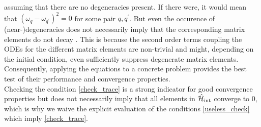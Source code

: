 assuming that there are no degeneracies present. If there were, it would mean that  $(\omega_q-\omega_{q^\prime})^2=0$ for some pair $q,q^\prime$. But even the occurence of (near-)degeneracies does not necessarily imply that the corresponding matrix elements do not decay \cite{PhysRevD.49.4214}. This is because the second order terms coupling the ODEs for the different matrix elements are non-trivial and might, depending on the initial condition, even sufficiently suppress degenerate matrix elements. \\
Consequently, applying the equations to a concrete problem provides the best test of their performance and convergence properties.\\
Checking the condition \ref{check_trace} is a strong indicator for good convergence properties but does not necessarily imply that all elements in $\hat{\mathcal{H}}_{\mathrm{int}}$ converge to 0, which is why we waive the explicit evaluation of the conditions \ref{useless_check} which imply \ref{check_trace}.
